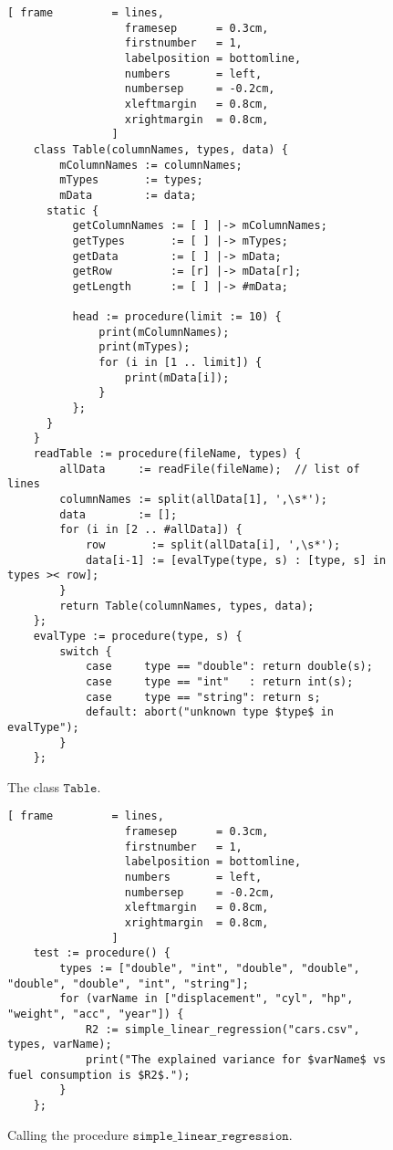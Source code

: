 \begin{figure}[!ht]
\centering
\begin{Verbatim}[ frame         = lines, 
                  framesep      = 0.3cm, 
                  firstnumber   = 1,
                  labelposition = bottomline,
                  numbers       = left,
                  numbersep     = -0.2cm,
                  xleftmargin   = 0.8cm,
                  xrightmargin  = 0.8cm,
                ]
    class Table(columnNames, types, data) {
        mColumnNames := columnNames;
        mTypes       := types;
        mData        := data;
      static {
          getColumnNames := [ ] |-> mColumnNames;
          getTypes       := [ ] |-> mTypes;
          getData        := [ ] |-> mData;
          getRow         := [r] |-> mData[r];
          getLength      := [ ] |-> #mData;
          
          head := procedure(limit := 10) {
              print(mColumnNames);
              print(mTypes);
              for (i in [1 .. limit]) {
                  print(mData[i]);
              }
          };
      }
    }
    readTable := procedure(fileName, types) {
        allData     := readFile(fileName);  // list of lines
        columnNames := split(allData[1], ',\s*');
        data        := [];
        for (i in [2 .. #allData]) {
            row       := split(allData[i], ',\s*');
            data[i-1] := [evalType(type, s) : [type, s] in types >< row];
        }
        return Table(columnNames, types, data);
    };
    evalType := procedure(type, s) {
        switch {
            case     type == "double": return double(s);
            case     type == "int"   : return int(s);
            case     type == "string": return s;
            default: abort("unknown type $type$ in evalType");
        }
    };
\end{Verbatim}
\vspace*{-0.3cm}
\caption{The class $\mathtt{Table}$.}
\label{fig:table.stlx}
\end{figure}


\begin{figure}[!ht]
\centering
\begin{Verbatim}[ frame         = lines, 
                  framesep      = 0.3cm, 
                  firstnumber   = 1,
                  labelposition = bottomline,
                  numbers       = left,
                  numbersep     = -0.2cm,
                  xleftmargin   = 0.8cm,
                  xrightmargin  = 0.8cm,
                ]
    test := procedure() {
        types := ["double", "int", "double", "double", "double", "double", "int", "string"];
        for (varName in ["displacement", "cyl", "hp", "weight", "acc", "year"]) {
            R2 := simple_linear_regression("cars.csv", types, varName);
            print("The explained variance for $varName$ vs fuel consumption is $R2$."); 
        }
    };
\end{Verbatim}
\vspace*{-0.3cm}
\caption{Calling the procedure $\mathtt{simple\_linear\_regression}$.}
\label{fig:simple-linear-regression.stlx:test}
\end{figure}


